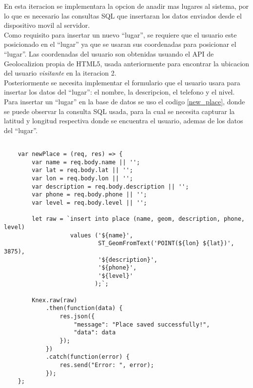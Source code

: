 En esta iteracion se implementara la opcion de anadir mas lugares al sistema, por lo que es necesario las consultas SQL que insertaran los datos enviados desde el dispositivo movil al servidor. \\

Como requisito para insertar un nuevo ``lugar'', se requiere que el usuario este posicionado en el ``lugar'' ya que se usaran sus coordenadas para posicionar el ``lugar''. Las coordenadas del usuario son obtenidas usuando el API de Geolocalizion propia de HTML5, usada anteriormente para encontrar la ubicacion del usuario \emph{visitante} en la iteracion 2.\\

Posteriormente se necesita implementar el formulario que el usuario usara para insertar los datos del ``lugar'': el nombre, la descripcion, el telefono y el nivel.\\

Para insertar un ``lugar''  en la base de datos se uso el codigo \ref{new_place}, donde se puede observar la consulta SQL usada, para la cual se necesita capturar la latitud y longitud respectiva donde se encuentra el usuario, ademas de los datos del ``lugar''.\\

\begin{center}
  \begin{lstlisting}[label=new_place,caption=Insertar un ``lugar'' en la base de datos.]

    var newPlace = (req, res) => {
        var name = req.body.name || '';
        var lat = req.body.lat || '';
        var lon = req.body.lon || '';
        var description = req.body.description || '';
        var phone = req.body.phone || '';
        var level = req.body.level || '';

        let raw = `insert into place (name, geom, description, phone, level)
                   values ('${name}',
                           ST_GeomFromText('POINT(${lon} ${lat})', 3875),
                           '${description}',
                           '${phone}',
                           '${level}'
                          );`;

        Knex.raw(raw)
            .then(function(data) {
                res.json({
                    "message": "Place saved successfully!",
                    "data": data
                });
            })
            .catch(function(error) {
                res.send("Error: ", error);
            });
    };

  \end{lstlisting}
\end{center}


